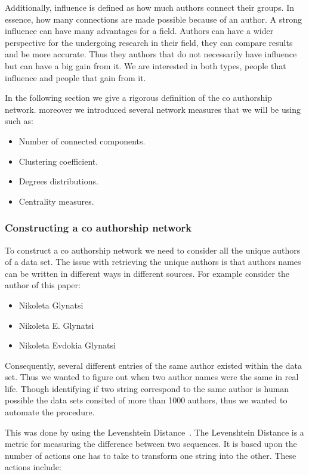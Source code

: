 \documentclass{article}
\theoremstyle{definition}
\begin{document}
Additionally, influence is defined as how much authors connect their groups.
In essence, how many connections are made possible because of an author. A strong
influence can have many advantages for a field. Authors can have a wider perspective
for the undergoing research in their field, they can compare results and be more
accurate. Thus they authors that do not necessarily have influence but can
have a big gain from it. We are interested in both types, people that influence
and people that gain from it.

In the following section we give a rigorous definition of the co authorship
network. moreover we introduced several network measures that we will be using
such as:

\begin{itemize}
    \item Number of connected components.
    \item Clustering coefficient.
    \item Degrees distributions.
    \item Centrality measures.
\end{itemize}

\subsubsection{Constructing a co authorship network}

To construct a co authorship network we need to consider all the unique authors of a data set.
The issue with retrieving the unique authors is that authors names can be written
in different ways in different sources. For example consider the author of this
paper:

\begin{itemize}
    \item Nikoleta Glynatsi
    \item Nikoleta E. Glynatsi
    \item Nikoleta Evdokia Glynatsi
\end{itemize}

Consequently, several different entries of the same author existed within the data
set. Thus we wanted to figure out when two author names were the same in real life.
Though identifying if two string correspond to the same author is human possible
the data sets consited of more than 1000 authors, thus we wanted to automate the
procedure.

This was done by using the Levenshtein Distance~\cite{miller2009}. The Levenshtein
Distance is a metric for measuring the difference between two sequences. It is
based upon the number of actions one has to take to transform one string into
the other. These actions include:
\end{document}
